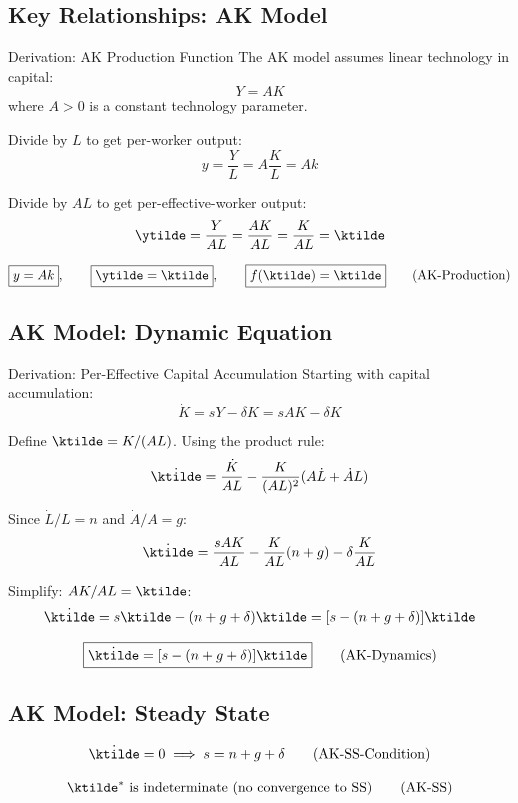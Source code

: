 \medskip
\subsection*{Key Relationships: AK Model}
\begin{derivationbox}{Derivation: AK Production Function}
The AK model assumes linear technology in capital:
\[
Y = A K
\]
where $A > 0$ is a constant technology parameter.

Divide by $L$ to get per-worker output:
\[
y = \frac{Y}{L} = A \frac{K}{L} = A k
\]

Divide by $AL$ to get per-effective-worker output:
\[
\ytilde = \frac{Y}{AL} = \frac{AK}{AL} = \frac{K}{AL} = \ktilde
\]
\end{derivationbox}

\begin{resultbox}
\[
\boxed{y = Ak}, \qquad \boxed{\ytilde = \ktilde}, \qquad \boxed{f(\ktilde) = \ktilde}
\tag{AK-Production}
\]
\end{resultbox}

\medskip
\subsection*{AK Model: Dynamic Equation}
\begin{derivationbox}{Derivation: Per-Effective Capital Accumulation}
Starting with capital accumulation:
\[
\dot{K} = sY - \delta K = sAK - \delta K
\]

Define $\ktilde = K/(AL)$. Using the product rule:
\[
\dot{\ktilde} = \frac{\dot{K}}{AL} - \frac{K}{(AL)^2}(A\dot{L} + \dot{A}L)
\]

Since $\dot{L}/L = n$ and $\dot{A}/A = g$:
\[
\dot{\ktilde} = \frac{sAK}{AL} - \frac{K}{AL}(n+g) - \delta\frac{K}{AL}
\]

Simplify: $AK/AL = \ktilde$:
\[
\dot{\ktilde} = s\ktilde - (n+g+\delta)\ktilde = [s - (n+g+\delta)]\ktilde
\]
\end{derivationbox}

\begin{resultbox}
\[
\boxed{\dot{\ktilde} = [s - (n+g+\delta)]\ktilde}
\tag{AK-Dynamics}
\]
\end{resultbox}

\medskip
\subsection*{AK Model: Steady State}
\begin{resultbox}
\[
\dot{\ktilde} = 0 \implies s = n + g + \delta
\tag{AK-SS-Condition}
\]

\[
\ktilde^* \text{ is indeterminate (no convergence to SS)}
\tag{AK-SS}
\]
\end{resultbox}

